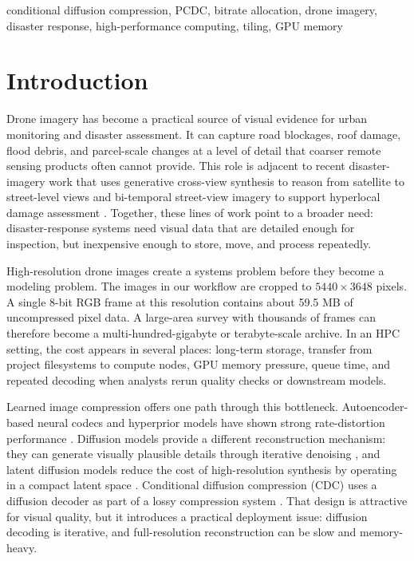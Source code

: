\documentclass[conference]{IEEEtran}
\begin{document}
\begin{IEEEkeywords}
conditional diffusion compression, PCDC, bitrate allocation, drone imagery, disaster response, high-performance computing, tiling, GPU memory
\end{IEEEkeywords}

\section{Introduction}

Drone imagery has become a practical source of visual evidence for urban monitoring and disaster assessment. It can capture road blockages, roof damage, flood debris, and parcel-scale changes at a level of detail that coarser remote sensing products often cannot provide. This role is adjacent to recent disaster-imagery work that uses generative cross-view synthesis to reason from satellite to street-level views \cite{yang2026satellite} and bi-temporal street-view imagery to support hyperlocal damage assessment \cite{yang2025hyperlocal}. Together, these lines of work point to a broader need: disaster-response systems need visual data that are detailed enough for inspection, but inexpensive enough to store, move, and process repeatedly.

High-resolution drone images create a systems problem before they become a modeling problem. The images in our workflow are cropped to $5440 \times 3648$ pixels. A single 8-bit RGB frame at this resolution contains about 59.5 MB of uncompressed pixel data. A large-area survey with thousands of frames can therefore become a multi-hundred-gigabyte or terabyte-scale archive. In an HPC setting, the cost appears in several places: long-term storage, transfer from project filesystems to compute nodes, GPU memory pressure, queue time, and repeated decoding when analysts rerun quality checks or downstream models.

Learned image compression offers one path through this bottleneck. Autoencoder-based neural codecs and hyperprior models have shown strong rate-distortion performance \cite{balle2018hyperprior}. Diffusion models provide a different reconstruction mechanism: they can generate visually plausible details through iterative denoising \cite{ho2020ddpm}, and latent diffusion models reduce the cost of high-resolution synthesis by operating in a compact latent space \cite{rombach2022ldm}. Conditional diffusion compression (CDC) uses a diffusion decoder as part of a lossy compression system \cite{yang2022lossy}. That design is attractive for visual quality, but it introduces a practical deployment issue: diffusion decoding is iterative, and full-resolution reconstruction can be slow and memory-heavy.
\end{document}

